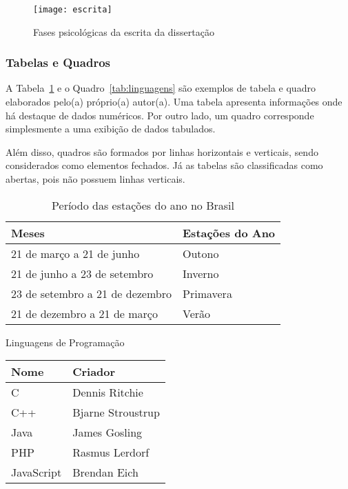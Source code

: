 \begin{figure}
	\caption{Fases psicológicas da escrita da dissertação}
	\label{fig:escrita}
	\centering%
	\begin{minipage}{.8\textwidth}
		\texttt{[image: escrita]}
	\end{minipage}
\end{figure}

\subsubsection{Tabelas e Quadros}
A Tabela~\ref{tab:estacoes} e o Quadro~\ref{tab:linguagens} são exemplos de tabela e quadro elaborados pelo(a) próprio(a) autor(a). Uma tabela apresenta informações onde há destaque de dados numéricos. Por outro lado, um quadro corresponde simplesmente a uma exibição de dados tabulados.

Além disso, quadros são formados por linhas horizontais e verticais, sendo considerados como elementos fechados. Já as tabelas são classificadas como abertas, pois não possuem linhas verticais.

\begin{table}
	\caption{Período das estações do ano no Brasil}
	\label{tab:estacoes}
	\centering%
	\begin{minipage}{.6\textwidth}
		\begin{tabular*}{\textwidth}{ll}
			\hline
			\textbf{Meses} & \textbf{Estações do Ano}\\
			\hline
			21 de março a 21 de junho & Outono\\
			21 de junho a 23 de setembro & Inverno\\
			23 de setembro a 21 de dezembro & Primavera\\
			21 de dezembro a 21 de março & Verão\\
			\hline
		\end{tabular*}
	\end{minipage}
\end{table}

\begin{board}
	\caption{Linguagens de Programação}
	\label{tab:linguagens}
	\centering%
	\begin{minipage}{.35\textwidth}
		\begin{tabular*}{\textwidth}{|l|l|}
			\hline
			\textbf{Nome} & \textbf{Criador}\\
			\hline
			C & Dennis Ritchie\\
			C++ & Bjarne Stroustrup\\
			Java & James Gosling\\
			PHP & Rasmus Lerdorf\\
			JavaScript & Brendan Eich\\
			\hline
		\end{tabular*}
	\end{minipage}
\end{board}




